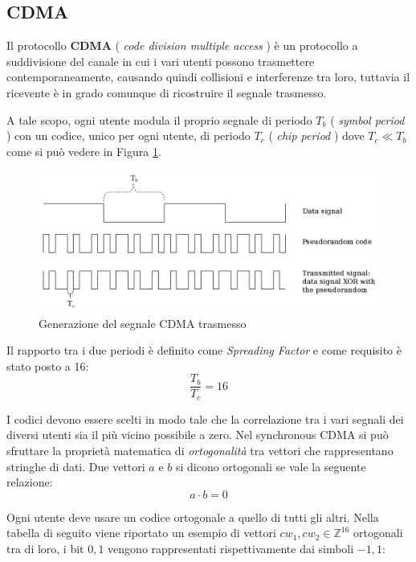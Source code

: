 \documentclass[a4paper,12pt]{article}
\begin{document}
  \subsection{CDMA}
    Il protocollo \textbf{CDMA} ( \textit{code division multiple access} ) è un protocollo a suddivisione del canale in 
    cui i vari utenti possono trasmettere contemporaneamente, causando quindi collisioni e interferenze tra loro, tuttavia
    il ricevente è in grado comunque di ricostruire il segnale trasmesso. 

    A tale scopo, ogni utente modula il proprio segnale di periodo $T_b$ ( \textit{symbol period} ) con un codice, unico
    per ogni utente, di periodo $T_c$ ( \textit{chip period} ) dove $T_c \ll T_b$ come si può vedere in Figura \ref{fig:Signals}.
    \begin{figure}[H]
      \centering
      \includegraphics[scale=0.2]{img/Generation_of_CDMA.svg.png}
      \caption{Generazione del segnale CDMA trasmesso }
      \label{fig:Signals}
    \end{figure}

    Il rapporto tra i due periodi è definito come \textit{ Spreading Factor } e come requisito è stato posto a 16:
    $$ \frac{T_b}{T_c} = 16 $$

    I codici devono essere scelti in modo tale che la correlazione tra i vari segnali dei diversi utenti sia il più vicino
    possibile a zero. Nel synchronous CDMA si può sfruttare la proprietà matematica di \textit{ortogonalità} tra vettori 
    che rappresentano stringhe di dati. Due vettori $a$ e $b$ si dicono ortogonali  se vale la seguente relazione:
    $$ a \cdot b = 0 $$

    Ogni utente deve usare un codice ortogonale a quello di tutti gli altri. Nella tabella di seguito viene riportato
    un esempio di vettori $cw_1, cw_2 \in \mathbb{Z}^{16} $  ortogonali tra di loro, i bit $0, 1$ vengono rappresentati 
    rispettivamente dai simboli $-1, 1$:
\end{document}
